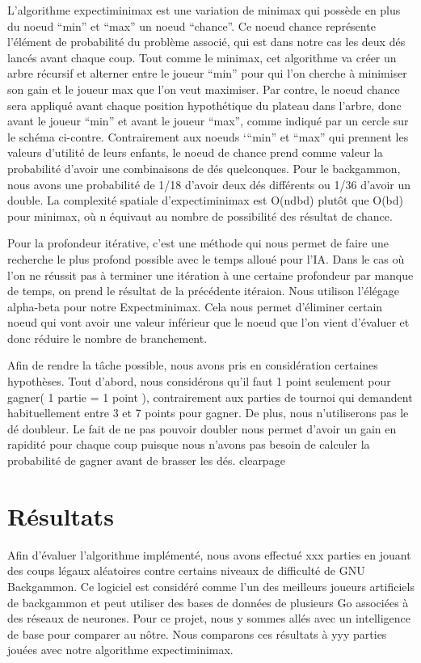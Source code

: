 \documentclass{article}
\begin{document}
L’algorithme expectiminimax est une variation de minimax qui possède en plus du
noeud “min” et “max” un noeud “chance”. Ce noeud chance représente l’élément de
probabilité du problème associé, qui est dans notre cas les deux dés lancés
avant chaque coup. Tout comme le minimax, cet algorithme va créer un arbre
récursif et alterner entre le joueur “min” pour qui l’on cherche à minimiser son
gain et le joueur max que l’on veut maximiser. Par contre, le noeud chance sera
appliqué avant chaque position hypothétique du plateau dans l’arbre, donc avant
le joueur “min” et avant le joueur “max”, comme indiqué par un cercle sur le
schéma ci-contre.  Contrairement aux noeuds ‘“min” et “max” qui prennent les
valeurs d’utilité de leurs enfants, le noeud de chance prend comme valeur la
probabilité d’avoir une combinaisons de dés quelconques. Pour le backgammon,
nous avons une probabilité de 1/18 d’avoir deux dés différents ou 1/36 d’avoir
un double. La complexité spatiale d’expectiminimax est O(ndbd) plutôt que O(bd)
pour minimax, où n équivaut au nombre de possibilité des résultat de chance.

Pour la profondeur itérative, c’est une méthode qui nous permet de faire une
recherche le plus profond possible avec le temps alloué pour l’IA. Dans le cas
où l’on ne réussit pas à terminer une itération à une certaine profondeur par
manque de temps, on prend le résultat de la précédente itéraion. Nous utilison
l’élégage alpha-beta pour notre Expectminimax. Cela nous permet d’éliminer
certain noeud qui vont avoir une valeur inférieur que le noeud que l’on vient
d’évaluer et donc réduire le nombre de branchement.

Afin de rendre la tâche possible, nous avons  pris en considération certaines
hypothèses. Tout d’abord, nous considérons qu’il faut 1 point seulement pour
gagner( 1 partie = 1 point ), contrairement aux parties de tournoi qui demandent
habituellement entre 3 et 7 points pour gagner. De plus, nous n’utiliserons pas
le dé doubleur. Le fait de ne pas pouvoir doubler nous permet d’avoir un gain en
rapidité pour chaque coup puisque nous n’avons pas besoin de calculer la
probabilité de gagner avant de brasser les dés.
clearpage 

\section{Résultats}
Afin d’évaluer l'algorithme implémenté, nous avons effectué xxx parties en
jouant des coups légaux aléatoires contre certains niveaux de difficulté de GNU
Backgammon. Ce logiciel est considéré comme l’un des meilleurs joueurs
artificiels de backgammon et peut utiliser des bases de données de plusieurs Go
associées à des réseaux de neurones. Pour ce projet, nous y sommes allés avec un
intelligence de base pour comparer au nôtre. Nous comparons ces résultats à yyy
parties jouées avec notre algorithme expectiminimax.
\end{document}
